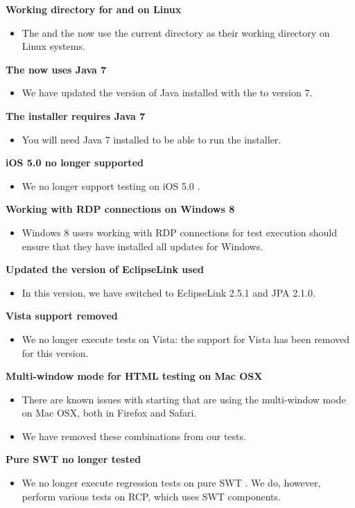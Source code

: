 \textbf{Working directory for \ite{} and \gdagent{} on Linux}
\begin{itemize}
\item The \gdagent{} and the \ite{} now  use the current directory as their working directory on Linux systems.
\end{itemize}


\textbf{The \ite{} now uses Java 7}
\begin{itemize}
\item We have updated the version of Java installed with the \ite{} to version 7.
\end{itemize}

\textbf{The installer requires Java 7}
\begin{itemize}
\item You will need Java 7 installed to be able to run the installer.
\end{itemize}

\textbf{iOS 5.0 no longer supported}
\begin{itemize}
\item We no longer support testing on iOS 5.0 \gdauts{}.
\end{itemize}

\textbf{Working with RDP connections on Windows 8}
\begin{itemize}
\item Windows 8 users working with RDP connections for test execution should ensure that they have installed all updates for Windows. 
\end{itemize}

\textbf{Updated the version of EclipseLink used}
\begin{itemize}
\item In this version, we have switched to EclipseLink 2.5.1 and JPA 2.1.0.
\end{itemize}

\textbf{Vista support removed}
\begin{itemize}
\item We no longer execute tests on Vista: the support for Vista has been removed for this version.
\end{itemize}

\textbf{Multi-window mode for HTML testing on Mac OSX}
\begin{itemize}
\item There are known issues with starting \gdauts{} that are using the multi-window mode on Mac OSX, both in Firefox and Safari.
\item We have removed these combinations from our tests.
\end{itemize}

\textbf{Pure SWT \gdauts{} no longer tested}
\begin{itemize}
\item We no longer execute regression tests on pure SWT \gdauts{}. We do, however, perform various tests on RCP, which uses SWT components. 
\end{itemize}
